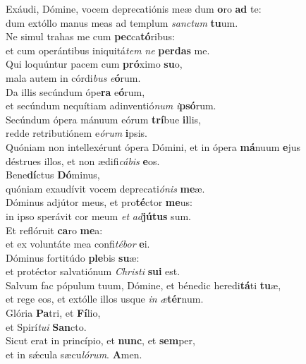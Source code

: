 \evenverse Exáudi, Dómine, vocem deprecatiónis meæ dum \textbf{o}ro \textbf{ad} te:~\*\\
\evenverse dum extóllo manus meas ad templum \textit{san}\textit{ctum} \textbf{tu}um.\\
\oddverse Ne simul trahas me cum \textbf{pec}ca\textbf{tó}ribus:~\*\\
\oddverse et cum operántibus iniquitá\textit{tem} \textit{ne} \textbf{per}\textbf{das} me.\\
\evenverse Qui loquúntur pacem cum \textbf{pró}ximo \textbf{su}o,~\*\\
\evenverse mala autem in córdi\textit{bus} \textit{e}\textbf{ó}rum.\\
\oddverse Da illis secúndum ópe\textbf{ra} e\textbf{ó}rum,~\*\\
\oddverse et secúndum nequítiam adinventió\textit{num} \textit{i}\textbf{psó}rum.\\
\evenverse Secúndum ópera mánuum eórum \textbf{trí}bue \textbf{il}lis,~\*\\
\evenverse redde retributiónem e\textit{ó}\textit{rum} \textbf{i}psis.\\
\oddverse Quóniam non intellexérunt ópera Dómini, et in ópera \textbf{má}nuum \textbf{e}jus~\*\\
\oddverse déstrues illos, et non ædifi\textit{cá}\textit{bis} \textbf{e}os.\\
\evenverse Bene\textbf{dí}ctus \textbf{Dó}minus,~\*\\
\evenverse quóniam exaudívit vocem deprecati\textit{ó}\textit{nis} \textbf{me}æ.\\
\oddverse Dóminus adjútor meus, et pro\textbf{té}ctor \textbf{me}us:~\*\\
\oddverse in ipso sperávit cor meum \textit{et} \textit{ad}\textbf{jú}\textbf{tus} sum.\\
\evenverse Et reflóruit \textbf{ca}ro \textbf{me}a:~\*\\
\evenverse et ex voluntáte mea confi\textit{té}\textit{bor} \textbf{e}i.\\
\oddverse Dóminus fortitúdo \textbf{ple}bis \textbf{su}æ:~\*\\
\oddverse et protéctor salvatiónum \textit{Chri}\textit{sti} \textbf{su}\textbf{i} est.\\
\evenverse Salvum fac pópulum tuum, Dómine, et bénedic heredi\textbf{tá}ti \textbf{tu}æ,~\*\\
\evenverse et rege eos, et extólle illos usque \textit{in} \textit{æ}\textbf{tér}num.\\
\oddverse Glória \textbf{Pa}tri, et \textbf{Fí}lio,~\*\\
\oddverse et Spirí\textit{tu}\textit{i} \textbf{San}cto.\\
\evenverse Sicut erat in princípio, et \textbf{nunc}, et \textbf{sem}per,~\*\\
\evenverse et in sǽcula sæcu\textit{ló}\textit{rum}. \textbf{A}men.\\
